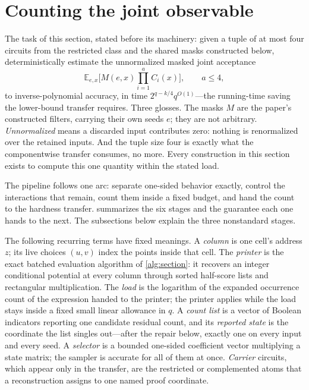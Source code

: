 \documentclass[11pt,letterpaper]{article}
\theoremstyle{definition}
\theoremstyle{remark}
\newcommand{\E}{\mathbb E}
\begin{document}
\section{Counting the joint observable}
\label{sec:count-overview}

The task of this section, stated before its machinery: given a tuple
of at most four circuits from the restricted class and the shared
masks constructed below, deterministically estimate the unnormalized
masked joint acceptance
\[
\E_{e,x}\Big[M(e,x)\prod_{i=1}^{a}C_i(x)\Big],\qquad a\le4,
\]
to inverse-polynomial accuracy, in time $2^{q-k/4}q^{O(1)}$---the
running-time saving the lower-bound transfer requires. Three glosses.
The masks $M$ are the paper's constructed filters, carrying their own
seeds $e$; they are not arbitrary. \emph{Unnormalized} means a
discarded input contributes zero: nothing is renormalized over the
retained inputs. And the tuple size four is exactly what the
componentwise transfer consumes, no more. Every construction in this
section exists to compute this one quantity within the stated load.

The pipeline follows one arc: separate one-sided behavior exactly,
control the interactions that remain, count them inside a fixed
budget, and hand the count to the hardness transfer.
 summarizes the six stages and the guarantee each
one hands to the next. The subsections below explain the three
nonstandard stages.

The following recurring terms have fixed meanings. A \emph{column} is one
cell's address $z$; its live choices $(u,v)$ index the points inside
that cell. The \emph{printer} is the exact batched evaluation
algorithm of \cref{alg:section}: it recovers an integer conditional
potential at every column through sorted half-score lists and
rectangular multiplication. The \emph{load} is the logarithm of the
expanded occurrence count of the expression handed to the printer;
the printer applies while the load stays inside a fixed small linear
allowance in $q$. A \emph{count list} is a vector of Boolean
indicators reporting one candidate residual count, and its
\emph{reported state} is the coordinate the list singles
out---after the repair below, exactly one on every input and every
seed. A \emph{selector} is a bounded one-sided coefficient vector
multiplying a state matrix; the sampler is accurate for all of them
at once. \emph{Carrier} circuits, which appear only in the transfer,
are the restricted or complemented atoms that a reconstruction
assigns to one named proof coordinate.
\end{document}
